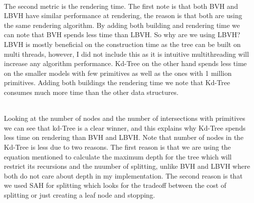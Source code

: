 \documentclass[11pt,a4paper]{article}
\begin{document}
\noindent
\\
The second metric is the rendering time.  The first note is that both BVH and LBVH have similar performance at rendering, the reason is that both are using the same rendering algorithm. By adding both building and rendering time we can note that BVH spends less time than LBVH. So why are we using LBVH? LBVH is mostly beneficial on the construction time as the tree can be built on multi threads, however, I did not include this as it is intuitive multithreading will increase any algorithm performance. Kd-Tree on the other hand spends less time on the smaller models with few primitives as well as the ones with 1 million primitives. Adding both buildings the rendering time we note that Kd-Tree consumes much more time than the other data structures. 

\noindent
\\
Looking at the number of nodes and the number of intersections with primitives we can see that kd-Tree is a clear winner, and this explains why Kd-Tree spends less time on rendering than BVH and LBVH. Note that number of nodes in the Kd-Tree is less due to two reasons. The first reason is that we are using the equation mentioned to calculate the maximum depth for the tree which will restrict its recursions and the nuumber of splitting, unlike BVH and LBVH where both do not care about depth in my implementation.  The second reason is that we used SAH for splitting which looks for the tradeoff between the cost of splitting or just creating a leaf node and stopping. 
\end{document}
